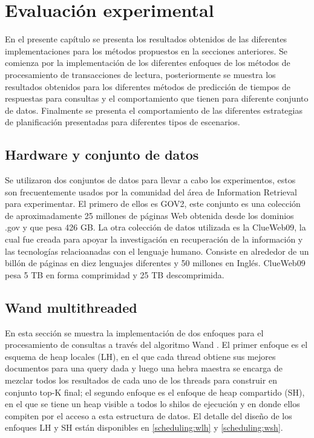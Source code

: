 \chapter{Evaluación experimental}
\label{cap:evaluacionexperimental}

En el presente capítulo se presenta los resultados obtenidos de las diferentes implementaciones para los métodos propuestos en la secciones anteriores. Se comienza por la implementación de los diferentes enfoques de los métodos de procesamiento de transacciones de lectura, posteriormente se muestra los resultados obtenidos para los diferentes métodos de predicción de tiempos de respuestas para consultas y el comportamiento que tienen para diferente conjunto de datos. Finalmente se presenta el comportamiento de las diferentes estrategias de planificación presentadas para diferentes tipos de escenarios.


\section{Hardware y conjunto de datos}
\label{evaluacionexperimental:hardwareydatos}

Se utilizaron dos conjuntos de datos para llevar a cabo los experimentos, estos son frecuentemente usados por la comunidad del área de Information Retrieval para experimentar. El primero de ellos es GOV2, este conjunto es una colección de aproximadamente 25 millones de páginas Web obtenida desde los dominios .gov y que pesa 426 GB. La otra colección de datos utilizada es la ClueWeb09, la cual fue creada para apoyar la investigación en recuperación de la información y las tecnologías relacioanadas con el lenguaje humano. Consiste en alrededor de un billón de páginas en diez lenguajes diferentes y 50 millones en Inglés. ClueWeb09 pesa 5 TB en forma comprimidad y 25 TB descomprimida. 




\section{Wand multithreaded}
\label{evaluacionexperimental:wm}
En esta sección se muestra la implementación de dos enfoques para el procesamiento de consultas a través del algoritmo Wand \citep{Broder:2003}. El primer enfoque es el esquema de heap locales (LH), en el que cada thread obtiene sus mejores documentos para una query dada y luego una hebra maestra se encarga de mezclar todos los resultados de cada uno de los threads para construir en conjunto top-K final; el segundo enfoque es el enfoque de heap compartido (SH), en el que se tiene un heap visible a todos lo shilos de ejecución y en donde ellos compiten por el acceso a esta estructura de datos. El detalle del diseño de los enfoques LH y SH están disponibles en \ref{scheduling:wlh} y \ref{scheduling:wsh}. 

